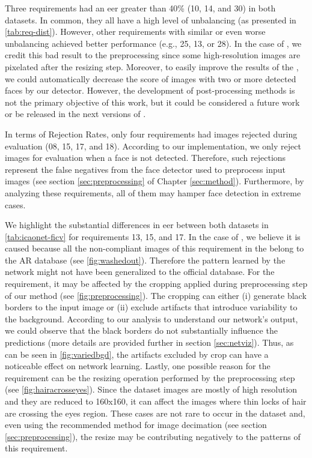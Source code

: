 

Three requirements had an \acs{eer} greater than 40\% (10, 14, and 30) in both datasets. In common, they all have a high level of unbalancing (as presented in \autoref{tab:req-dist}). However, other requirements with similar or even worse unbalancing achieved better performance (e.g., 25, 13, or 28). In the case of \pixelation, we credit this bad result to the preprocessing since some high-resolution images are pixelated after the resizing step. Moreover, to easily improve the results of the \otherfacesortoys, we could automatically decrease the score of images with two or more detected faces by our detector. However, the development of post-processing methods is not the primary objective of this work, but it could be considered a future work or be released in the next versions of \methodname.

In terms of Rejection Rates, only four requirements had images rejected during evaluation (08, 15, 17, and 18). According to our implementation, we only reject images for evaluation when a face is not detected. Therefore, such rejections represent the false negatives from the face detector used to preprocess input images (see section \ref{sec:preprocessing} of Chapter \ref{sec:method}). Furthermore, by analyzing these requirements, all of them may hamper face detection in extreme cases. 

We highlight the substantial differences in \acs{eer} between both datasets in \autoref{tab:icaonet-ficv} for requirements 13, 15, and 17. In the case of \washedout, we believe it is caused because all the non-compliant images of this requirement in the \ficvtest belong to the AR database (see \autoref{fig:washedout}). Therefore the pattern learned by the network might not have been generalized to the official database. For the \variedbackground requirement, it may be affected by the cropping applied during preprocessing step of our method (see \autoref{fig:preprocessing}). The cropping can either (i) generate black borders to the input image or (ii) exclude artifacts that introduce variability to the background. According to our analysis to understand our network's output, we could observe that the black borders do not substantially influence the predictions (more details are provided further in section \ref{sec:netviz}). Thus, as can be seen in \autoref{fig:variedbgd}, the artifacts excluded by crop can have a noticeable effect on network learning. Lastly, one possible reason for the \hairacrosseyes requirement can be the resizing operation performed by the preprocessing step (see \autoref{fig:hairacrosseyes}). Since the \adhoc dataset images are mostly of high resolution and they are reduced to 160x160, it can affect the images where thin locks of hair are crossing the eyes region. These cases are not rare to occur in the dataset and, even using the recommended method for image decimation (see section \ref{sec:preprocessing}), the resize may be contributing negatively to the patterns of this requirement. 


